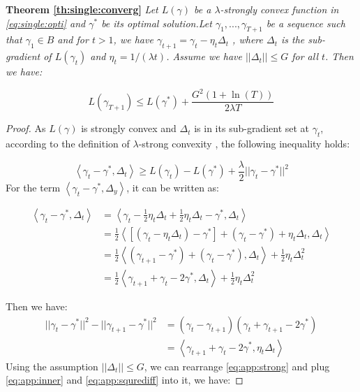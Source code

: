 \textbf{Theorem \ref{th:single:converg}}
	\textit{Let $L(\gamma)$ be a $\lambda$-strongly convex function in \eqref{eq:single:opti} and $\gamma^*$ be its optimal solution.Let $\gamma_1,...,\gamma_{T+1}$ be a sequence such that $\gamma_1 \in B$ and for $t>1$, we have $\gamma_{t+1} = \gamma_t - \eta_t \Delta_t$ , where $\Delta_t$ is the sub-gradient of $L(\gamma_t)$ and $\eta_t = 1/(\lambda t)$. Assume we have $||\Delta_t|| \leq G$ for all $t$. Then we have:}
	
	\begin{equation}
	L(\gamma_{T+1}) \leq L(\gamma^*)+\frac{G^2(1+\ln (T))}{2\lambda T}
	\end{equation}

\begin{proof}
	As $L(\gamma)$ is strongly convex and $\Delta_t$ is in its sub-gradient set at $\gamma_t$, according to the definition of $\lambda$-strong convexity \cite{rockafellar2015convex}, the following inequality holds:
	
	\begin{equation}\label{eq:app:strong}
		\left\langle {\gamma_t - \gamma^*,\Delta_t} \right\rangle \geq L(\gamma_t)-L(\gamma^*)+\frac{\lambda}{2}||\gamma_t - \gamma^*||^2
	\end{equation} 
	For the term $\left\langle {\gamma_t - \gamma^*,\Delta_y} \right\rangle$, it can be written as:
	
	\begin{equation} \label{eq:app:inner}
	\begin{aligned}
	\left\langle {\gamma_t - \gamma^*,\Delta_t} \right\rangle &= \left\langle {\gamma_t - \frac{1}{2}\eta_t\Delta_t + \frac{1}{2}\eta_t\Delta_t- \gamma^*,\Delta_t} \right\rangle\\
	&=\frac{1}{2}\left\langle {\left[ {\left( {{\gamma _t} - {\eta _t}{\Delta _t}} \right) - {\gamma ^*}} \right] + \left( {{\gamma _t} - {\gamma ^*}} \right) + {\eta _t}{\Delta _t},{\Delta _t}} \right\rangle \\
	&= \frac{1}{2}\left\langle {\left( {{\gamma _{t + 1}} - {\gamma ^*}} \right) + \left( {{\gamma _t} - {\gamma ^*}} \right),{\Delta _t}} \right\rangle  + \frac{1}{2}{\eta _t}\Delta _t^2\\
	&=\frac{1}{2}\left\langle {{\gamma _{t + 1}} + {\gamma _t} - 2{\gamma ^*},{\Delta _t}} \right\rangle  + \frac{1}{2}{\eta _t}\Delta _t^2
	\end{aligned}
	\end{equation}
	
	Then we have:
	\begin{equation}\label{eq:app:squrediff}
	\begin{aligned}
	||\gamma_t-\gamma^*||^2-||\gamma_{t+1}-\gamma^*||^2 &= ( {{\gamma _t} - {\gamma _{t + 1}}})  ({{\gamma _t} + {\gamma _{t + 1}} - 2{\gamma ^*}}) \\
	&=\left\langle {{\gamma _{t + 1}} + {\gamma _t} - 2{\gamma ^*},{\eta_t\Delta _t}} \right\rangle
	\end{aligned}
	\end{equation}
	Using the assumption $||\Delta_t|| \leq G$, we can rearrange \eqref{eq:app:strong} and plug \eqref{eq:app:inner} and \eqref{eq:app:squrediff} into it, we have:
	

\end{proof}
